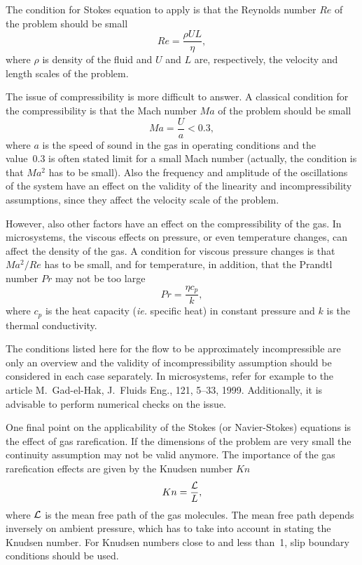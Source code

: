 The condition for Stokes equation to apply is that the Reynolds number
$Re$ of the problem should be small
\begin{equation}
Re = \frac{\rho UL}{\eta},
\end{equation}
where $\rho$ is density of the fluid and $U$ and $L$ are,
respectively, the velocity and length scales of the problem.

The issue of compressibility is more difficult to answer. A classical
condition for the compressibility is that the Mach number $Ma$ of the
problem should be small
\begin{equation}
Ma = \frac{U}{a} < 0.3,
\end{equation}
where $a$ is the speed of sound in the gas in operating conditions and
the value~0.3 is often stated limit for a small Mach number (actually,
the condition is that $Ma^2$ has to be small).  Also the frequency and
amplitude of the oscillations of the system have an effect on the
validity of the linearity and incompressibility assumptions, since
they affect the velocity scale of the problem.

However, also other factors have an effect on the compressibility of
the gas. In microsystems, the viscous effects on pressure, or even
temperature changes, can affect the density of the gas. A
condition for viscous pressure changes is that $Ma^2/Re$ has to be
small, and for temperature, in addition, that the Prandtl number $Pr$
may not be too large
\begin{equation}
Pr = \frac{\eta c_p}{k},
\end{equation}
where $c_p$ is the heat capacity ({\em ie.} specific heat) in constant
pressure and $k$ is the thermal conductivity.

The conditions listed here for the flow to be approximately
incompressible are only an overview and the validity of
incompressibility assumption should be considered in each case
separately. In microsystems, refer for example to the article
M.~Gad-el-Hak, J.~Fluids Eng., 121, 5--33, 1999. Additionally, it is
advisable to perform numerical checks on the issue.

One final point on the applicability of the Stokes (or Navier-Stokes)
equations is the effect of gas rarefication. If the dimensions of the
problem are very small the continuity assumption may not be valid
anymore. The importance of the gas rarefication effects are given by
the Knudsen number $Kn$
\begin{equation}
Kn = \frac{{\cal L}}{L},
\end{equation}
where ${\cal L}$ is the mean free path of the gas molecules. The mean
free path depends inversely on ambient pressure, which has to take
into account in stating the Knudsen number. For Knudsen numbers close
to and less than~1, slip boundary conditions should be used.

